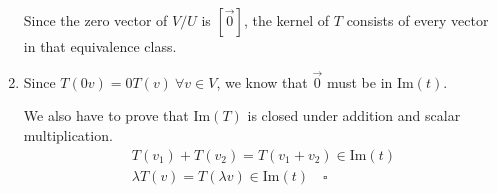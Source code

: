 \documentclass[12pt]{article}
\begin{document}
\begin{enumerate}
            Since the zero vector of $V/U$ is $[\vec{0}]$, the kernel of $T$ consists of every
            vector in that equivalence class.
      \item Since $T(0v)=0T(v)\ \forall v \in V$, we know that $\vec{0}$ must be in $\text{Im}(t)$.

            We also have to prove that $\text{Im}(T)$ is closed under addition and scalar multiplication.
            \begin{gather*}
                  T(v_1)+T(v_2)=T(v_1+v_2) \in \text{Im}(t) \\
                  \lambda T(v)=T(\lambda v) \in \text{Im}(t)\quad\square
            \end{gather*}
\end{enumerate}
\end{document}
